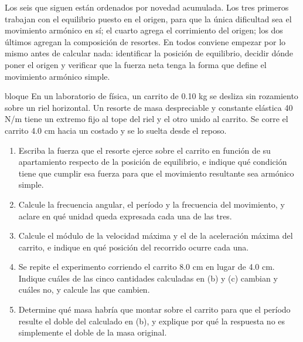 \documentclass[11pt,openany]{book}
\begin{document}
Los seis que siguen están ordenados por novedad acumulada. Los tres primeros trabajan con el equilibrio puesto en el origen, para que la única dificultad sea el movimiento armónico en sí; el cuarto agrega el corrimiento del origen; los dos últimos agregan la composición de resortes. En todos conviene empezar por lo mismo antes de calcular nada: identificar la posición de equilibrio, decidir dónde poner el origen y verificar que la fuerza neta tenga la forma que define el movimiento armónico simple.

\begin{ejercicio}{bloque}
En un laboratorio de física, un carrito de 0.10 kg se desliza sin rozamiento sobre un riel horizontal. Un resorte de masa despreciable y constante elástica 40 N/m tiene un extremo fijo al tope del riel y el otro unido al carrito. Se corre el carrito 4.0 cm hacia un costado y se lo suelta desde el reposo.
\begin{enumerate}[label=(\alph*), leftmargin=1.7em, itemsep=1pt, topsep=3pt]
  \item Escriba la fuerza que el resorte ejerce sobre el carrito en función de su apartamiento respecto de la posición de equilibrio, e indique qué condición tiene que cumplir esa fuerza para que el movimiento resultante sea armónico simple.
  \item Calcule la frecuencia angular, el período y la frecuencia del movimiento, y aclare en qué unidad queda expresada cada una de las tres.
  \item Calcule el módulo de la velocidad máxima y el de la aceleración máxima del carrito, e indique en qué posición del recorrido ocurre cada una.
  \item Se repite el experimento corriendo el carrito 8.0 cm en lugar de 4.0 cm. Indique cuáles de las cinco cantidades calculadas en (b) y (c) cambian y cuáles no, y calcule las que cambien.
  \item Determine qué masa habría que montar sobre el carrito para que el período resulte el doble del calculado en (b), y explique por qué la respuesta no es simplemente el doble de la masa original.
\end{enumerate}
\end{ejercicio}
\end{document}
